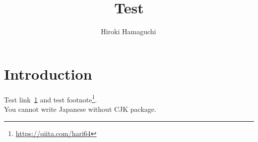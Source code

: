 \documentclass[11pt]{article}
\begin{document}
\title{Test}

\author[1]{Hiroki Hamaguchi\,}
\date{}

\maketitle

\section{Introduction}\label{sec:introduction}

Test link~\ref{sec:introduction} and test footnote\footnote{\url{https://qiita.com/hari64}}.\\
You cannot write Japanese without CJK package.
\end{document}
